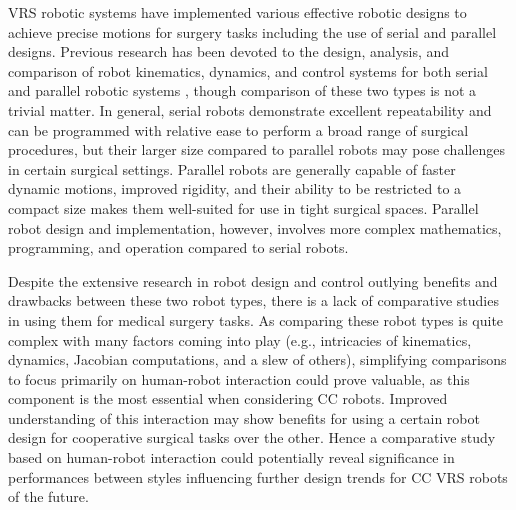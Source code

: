 \documentclass[letterpaper, 10 pt, conference]{ieeeconf}  %
\begin{document}

VRS robotic systems have implemented various effective robotic designs to achieve precise motions for surgery tasks including the use of serial and parallel designs. Previous research has been devoted to the design, analysis, and comparison of robot kinematics, dynamics, and control systems for both serial and parallel robotic systems \cite{pandilov2014comparison},\cite{nzue2013comparison} though comparison of these two types is not a trivial matter. In general, serial robots demonstrate excellent repeatability and can be programmed with relative ease to perform a broad range of surgical procedures, but their larger size compared to parallel robots may pose challenges in certain surgical settings. Parallel robots are generally capable of faster dynamic motions, improved rigidity, and their ability to be restricted to a compact size makes them well-suited for use in tight surgical spaces. Parallel robot design and implementation, however, involves more complex mathematics, programming, and operation compared to serial robots.

Despite the extensive research in robot design and control outlying benefits and drawbacks between these two robot types, there is a lack of comparative studies in using them for medical surgery tasks. As comparing these robot types is quite complex with many factors coming into play (e.g., intricacies of kinematics, dynamics, Jacobian computations, and a slew of others), simplifying comparisons to focus primarily on human-robot interaction could prove valuable, as this component is the most essential when considering CC robots. Improved understanding of this interaction may show benefits for using a certain robot design for cooperative surgical tasks over the other. 
Hence a comparative study based on human-robot interaction could potentially reveal significance in performances between styles influencing further design trends for CC VRS robots of the future.
\end{document}
